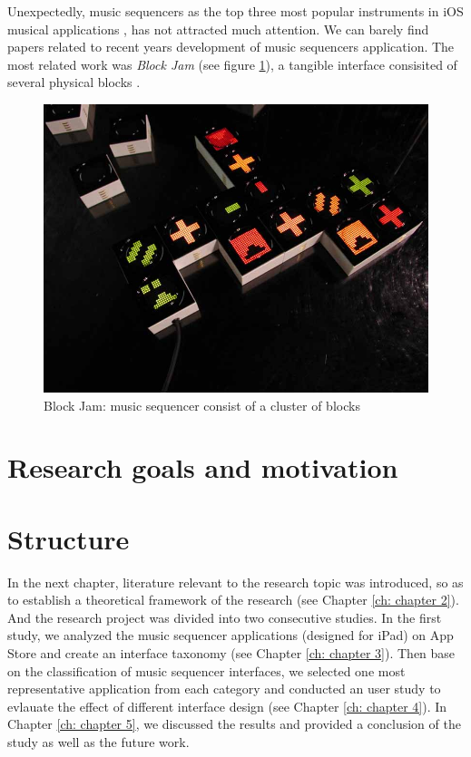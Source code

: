 Unexpectedly, music sequencers as the top three most popular instruments in iOS musical applications \citep{Reference14}, has not attracted much attention. We can barely find papers related to recent years development of music sequencers application. The most related work was \textit{Block Jam} (see figure \ref{fig: Block Jam}), a tangible interface consisited of several physical blocks \citep{Reference20}.

\bigskip
\begin{figure}[h]
  \includegraphics[width=12 cm]{images/blockjam.jpg}
  \centering
  \caption{Block Jam: music sequencer consist of a cluster of blocks}
  \label{fig: Block Jam}
\end{figure}
\bigskip

\section{Research goals and motivation}

\section{Structure}

In the next chapter, literature relevant to the research topic was introduced, so as to establish a theoretical framework of the research (see Chapter \ref{ch: chapter 2}). And the research project was divided into two consecutive studies. In the first study, we analyzed the music sequencer applications (designed for iPad) on App Store and create an interface taxonomy (see Chapter \ref{ch: chapter 3}). Then base on the classification of music sequencer interfaces, we selected one most representative application from each category and conducted an user study to evlauate the effect of different interface design (see Chapter \ref{ch: chapter 4}). In Chapter \ref{ch: chapter 5}, we discussed the results and provided a conclusion of the study as well as the future work.
